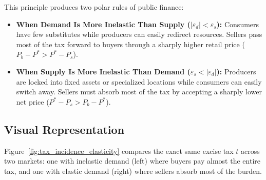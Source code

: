 \documentclass[11pt,letterpaper]{article}
\begin{document}
This principle produces two polar rules of public finance:
\begin{itemize}
    \item \textbf{When Demand Is More Inelastic Than Supply ($|\varepsilon_d| < \varepsilon_s$):} Consumers have few substitutes while producers can easily redirect resources. Sellers pass most of the tax forward to buyers through a sharply higher retail price ($P_b - P^* > P^* - P_s$).
    \item \textbf{When Supply Is More Inelastic Than Demand ($\varepsilon_s < |\varepsilon_d|$):} Producers are locked into fixed assets or specialized locations while consumers can easily switch away. Sellers must absorb most of the tax by accepting a sharply lower net price ($P^* - P_s > P_b - P^*$).
\end{itemize}

\subsection*{Visual Representation}
Figure~\ref{fig:tax_incidence_elasticity} compares the exact same excise tax $t$ across two markets: one with inelastic demand (left) where buyers pay almost the entire tax, and one with elastic demand (right) where sellers absorb most of the burden.
\end{document}
